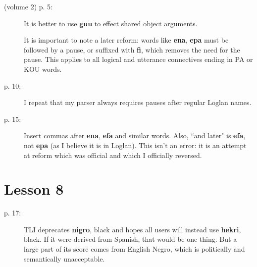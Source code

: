 \documentclass[12pt]{article}
\begin{document}
\begin{description}

\item[(volume 2) p. 5:]  It is better to use {\bf guu} to effect shared object arguments.

It is important to note a later reform:  words like {\bf ena}, {\bf epa} must be followed by a pause, or suffixed with {\bf fi}, which removes the need for the pause.  This applies to all logical and utterance connectives ending in PA or KOU words.

\item[p. 10:]  I repeat that my parser always requires pauses after regular Loglan names.

\item[p. 15:]  Insert commas after {\bf ena}, {\bf efa} and similar words.  Also, ``and later" is
{\bf efa}, not {\bf epa} (as I believe it is in Loglan).  This isn't an error:  it is an attempt at reform which was official and which I officially reversed.

\end{description}

\section{Lesson 8}

\begin{description}

\item[p. 17:]  TLI deprecates {\bf nigro}, black and hopes all users will instead use {\bf hekri}, black.  If it were derived from Spanish, that would be one thing.  But a large part of its score comes from English Negro, which is politically and semantically unacceptable.

\end{description}
\end{document}
